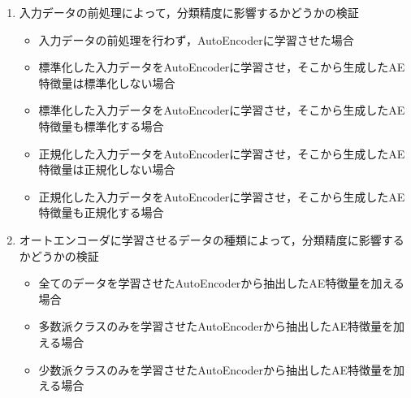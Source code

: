 \begin{enumerate}
    \item 入力データの前処理によって，分類精度に影響するかどうかの検証
    \begin{itemize}
        \item 入力データの前処理を行わず，AutoEncoderに学習させた場合
        \item 標準化した入力データをAutoEncoderに学習させ，そこから生成したAE特徴量は標準化しない場合
        \item 標準化した入力データをAutoEncoderに学習させ，そこから生成したAE特徴量も標準化する場合
        \item 正規化した入力データをAutoEncoderに学習させ，そこから生成したAE特徴量は正規化しない場合
        \item 正規化した入力データをAutoEncoderに学習させ，そこから生成したAE特徴量も正規化する場合
    \end{itemize}

    \item オートエンコーダに学習させるデータの種類によって，分類精度に影響するかどうかの検証
    \begin{itemize}
        \item 全てのデータを学習させたAutoEncoderから抽出したAE特徴量を加える場合
        \item 多数派クラスのみを学習させたAutoEncoderから抽出したAE特徴量を加える場合
        \item 少数派クラスのみを学習させたAutoEncoderから抽出したAE特徴量を加える場合
    \end{itemize}

    

\end{enumerate}